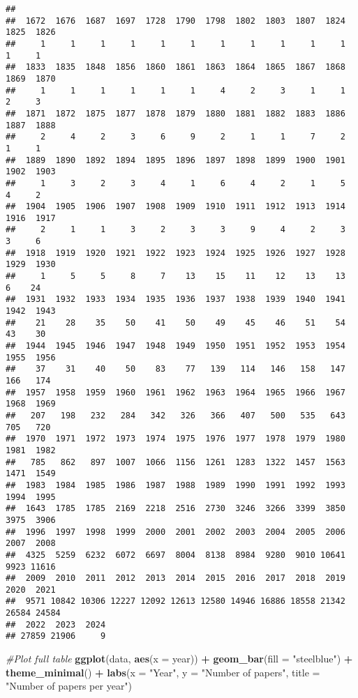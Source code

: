 \documentclass[
]{article}
\newenvironment{Shaded}{\begin{snugshade}}{\end{snugshade}}
\newcommand{\AttributeTok}[1]{\textcolor[rgb]{0.13,0.29,0.53}{#1}}
\newcommand{\CommentTok}[1]{\textcolor[rgb]{0.56,0.35,0.01}{\textit{#1}}}
\newcommand{\FunctionTok}[1]{\textcolor[rgb]{0.13,0.29,0.53}{\textbf{#1}}}
\newcommand{\NormalTok}[1]{#1}
\newcommand{\SpecialCharTok}[1]{\textcolor[rgb]{0.81,0.36,0.00}{\textbf{#1}}}
\newcommand{\StringTok}[1]{\textcolor[rgb]{0.31,0.60,0.02}{#1}}
\begin{document}
\begin{verbatim}
## 
##  1672  1676  1687  1697  1728  1790  1798  1802  1803  1807  1824  1825  1826 
##     1     1     1     1     1     1     1     1     1     1     1     1     1 
##  1833  1835  1848  1856  1860  1861  1863  1864  1865  1867  1868  1869  1870 
##     1     1     1     1     1     1     4     2     3     1     1     2     3 
##  1871  1872  1875  1877  1878  1879  1880  1881  1882  1883  1886  1887  1888 
##     2     4     2     3     6     9     2     1     1     7     2     1     1 
##  1889  1890  1892  1894  1895  1896  1897  1898  1899  1900  1901  1902  1903 
##     1     3     2     3     4     1     6     4     2     1     5     4     2 
##  1904  1905  1906  1907  1908  1909  1910  1911  1912  1913  1914  1916  1917 
##     2     1     1     3     2     3     3     9     4     2     3     3     6 
##  1918  1919  1920  1921  1922  1923  1924  1925  1926  1927  1928  1929  1930 
##     1     5     5     8     7    13    15    11    12    13    13     6    24 
##  1931  1932  1933  1934  1935  1936  1937  1938  1939  1940  1941  1942  1943 
##    21    28    35    50    41    50    49    45    46    51    54    43    30 
##  1944  1945  1946  1947  1948  1949  1950  1951  1952  1953  1954  1955  1956 
##    37    31    40    50    83    77   139   114   146   158   147   166   174 
##  1957  1958  1959  1960  1961  1962  1963  1964  1965  1966  1967  1968  1969 
##   207   198   232   284   342   326   366   407   500   535   643   705   720 
##  1970  1971  1972  1973  1974  1975  1976  1977  1978  1979  1980  1981  1982 
##   785   862   897  1007  1066  1156  1261  1283  1322  1457  1563  1471  1549 
##  1983  1984  1985  1986  1987  1988  1989  1990  1991  1992  1993  1994  1995 
##  1643  1785  1785  2169  2218  2516  2730  3246  3266  3399  3850  3975  3906 
##  1996  1997  1998  1999  2000  2001  2002  2003  2004  2005  2006  2007  2008 
##  4325  5259  6232  6072  6697  8004  8138  8984  9280  9010 10641  9923 11616 
##  2009  2010  2011  2012  2013  2014  2015  2016  2017  2018  2019  2020  2021 
##  9571 10842 10306 12227 12092 12613 12580 14946 16886 18558 21342 26584 24584 
##  2022  2023  2024 
## 27859 21906     9
\end{verbatim}

\begin{Shaded}
\begin{Highlighting}[]
\CommentTok{\#Plot full table}
\FunctionTok{ggplot}\NormalTok{(data, }\FunctionTok{aes}\NormalTok{(}\AttributeTok{x =}\NormalTok{ year)) }\SpecialCharTok{+}
  \FunctionTok{geom\_bar}\NormalTok{(}\AttributeTok{fill =} \StringTok{"steelblue"}\NormalTok{) }\SpecialCharTok{+}
  \FunctionTok{theme\_minimal}\NormalTok{() }\SpecialCharTok{+}
  \FunctionTok{labs}\NormalTok{(}\AttributeTok{x =} \StringTok{"Year"}\NormalTok{, }\AttributeTok{y =} \StringTok{"Number of papers"}\NormalTok{, }\AttributeTok{title =} \StringTok{"Number of papers per year"}\NormalTok{)}
\end{Highlighting}
\end{Shaded}
\end{document}
